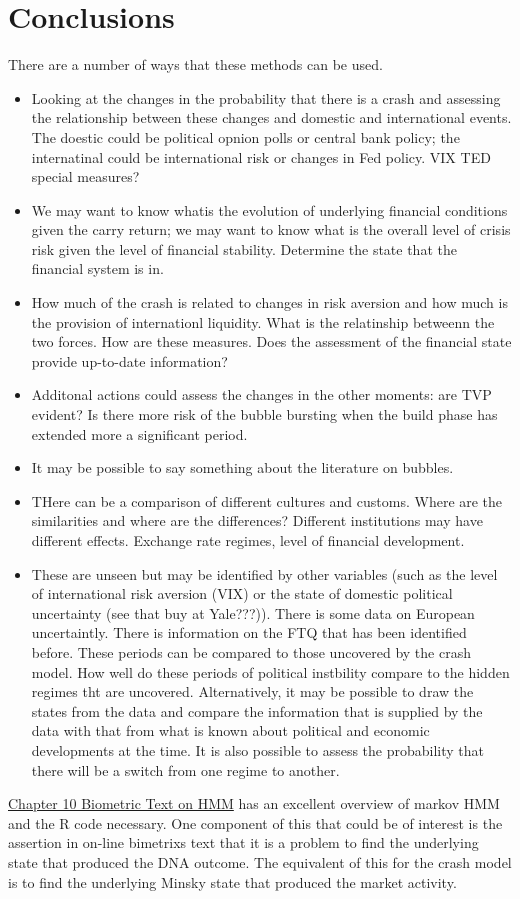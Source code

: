\documentclass[12pt, a4paper, oneside]{article} %
\begin{document}
\section{Conclusions}
There are a number of ways that these methods can be used. 
\begin{itemize}
\item Looking at the changes in the probability that there is a crash and assessing the relationship between these changes and domestic and international events.  The doestic could be political opnion polls or central bank policy; the internatinal could be international risk or changes in Fed policy.   VIX TED special measures?  
\item We may want to know whatis the evolution of underlying financial conditions given the carry return; we may want to know what is the overall level of crisis risk given the level of financial stability.  Determine the state that the financial system is in. 
\item How much of the crash is related to changes in risk aversion and how much is the provision of internationl liquidity.  What is the relatinship betweenn the two forces. How are these measures.  Does the assessment of the financial state provide up-to-date information? 
\item Additonal actions could assess the changes in the other moments:  are TVP evident?  Is there more risk of the bubble bursting when the build phase has extended more a significant period. 
\item It may be possible to say something about the literature on bubbles. 
\item THere can be a comparison of different cultures and customs. Where are the similarities and where are the differences?  Different institutions may have different effects. Exchange rate regimes, level of financial development. 
\item These are unseen but may be identified by other variables (such as the level of international risk aversion (VIX) or the state of domestic political uncertainty (see that buy at Yale???)).  There is some data on European uncertaintly. There is information on the FTQ that has been identified before. These periods can be compared to those uncovered by the crash model.  How well do these periods of political instbility compare to the hidden regimes tht are uncovered.  Alternatively, it may be possible to draw the states from the data and compare the information that is supplied by the data with that from what is known about political and economic developments at the time.  It is also possible to assess the probability that there will be a switch from one regime to another.
\end{itemize}

\href{http://a-little-book-of-r-for-bioinformatics.readthedocs.org/en/latest/src/chapter10.html}{Chapter 10 Biometric Text on HMM}
has an excellent overview of markov HMM and the R code necessary. One component of this that could be of interest is the assertion in on-line bimetrixs text that it is a problem to find the underlying state that produced the DNA outcome.  The equivalent of this for the crash model is to find the underlying Minsky state that produced the market activity.


\end{document}
